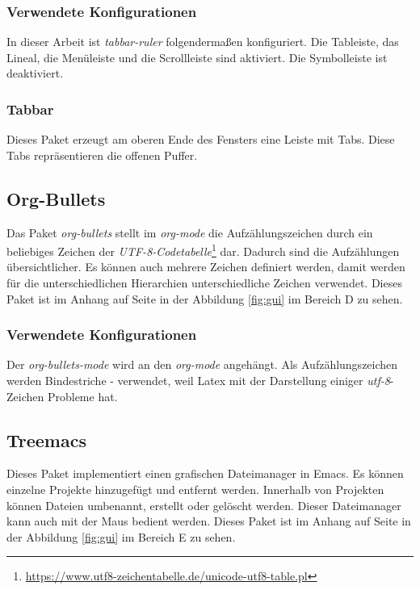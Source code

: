 \subsubsection{Verwendete Konfigurationen}
In dieser Arbeit ist \textit{tabbar-ruler} folgendermaßen
konfiguriert. Die Tableiste, das Lineal, die Menüleiste und die
Scrollleiste sind aktiviert. Die Symbolleiste ist deaktiviert.\\

\subsubsection{Tabbar}
\label{subsubsec:tabbar}
Dieses Paket erzeugt am oberen Ende des Fensters eine Leiste mit
Tabs. Diese Tabs repräsentieren die offenen Puffer. \cite{Tabbar}\\

\subsection{Org-Bullets}
\label{subsec:orgbullets}
Das Paket \textit{org-bullets} stellt im \textit{org-mode} die
Aufzählungszeichen durch ein beliebiges Zeichen der
\textit{UTF-8-Codetabelle}\footnote{\url{https://www.utf8-zeichentabelle.de/unicode-utf8-table.pl}}
dar. Dadurch sind die Aufzählungen übersichtlicher. Es können auch
mehrere Zeichen definiert werden, damit werden für die
unterschiedlichen Hierarchien unterschiedliche Zeichen
verwendet. Dieses Paket ist im Anhang auf Seite \pageref{fig:gui} in
der Abbildung \ref{fig:gui} im Bereich {\glqq}D{\grqq} zu
sehen. \cite{OrgBullets}\\

\subsubsection{Verwendete Konfigurationen}
Der \textit{org-bullets-mode} wird an den \textit{org-mode}
angehängt. Als Aufzählungszeichen werden Bindestriche {\glqq}-{\grqq}
verwendet, weil Latex mit der Darstellung einiger
\textit{utf-8}-Zeichen Probleme hat.\\

\subsection{Treemacs}
\label{subsec:treemacs}
Dieses Paket implementiert einen grafischen Dateimanager in Emacs. Es
können einzelne Projekte hinzugefügt und entfernt werden. Innerhalb
von Projekten können Dateien umbenannt, erstellt oder gelöscht
werden. Dieser Dateimanager kann auch mit der Maus bedient
werden. Dieses Paket ist im Anhang auf Seite \pageref{fig:gui} in der
Abbildung \ref{fig:gui} im Bereich {\glqq}E{\grqq} zu
sehen. \cite{Treemacs}\\

